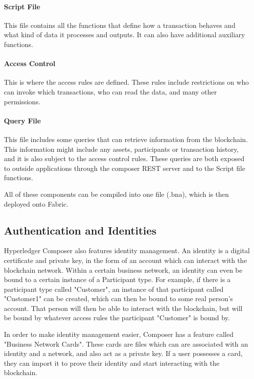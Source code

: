 \paragraph{Script File} This file contains all the functions that define how a transaction behaves and what kind of data it processes and outputs. It can also have additional auxiliary functions.

\paragraph{Access Control} This is where the access rules are defined. These rules include restrictions on who can invoke which transactions, who can read the data, and many other permissions.

\paragraph{Query File} This file includes some queries that can retrieve information from the blockchain. This information might include any assets, participants or transaction history, and it is also subject to the access control rules. These queries are both exposed to outside applications through the composer REST server and to the Script file functions.


All of these components can be compiled into one file (.bna), which is then deployed onto Fabric.

\subsection{Authentication and Identities}

Hyperledger Composer also features identity management. An identity is a digital certificate and private key, in the form of an account which can interact with the blockchain network. Within a certain business network, an identity can even be bound to a certain instance of a Participant type. For example, if there is a participant type called "Customer", an instance of that participant called "Customer1" can be created, which can then be bound to some real person's account. That person will then be able to interact with the blockchain, but will be bound by whatever access rules the participant "Customer" is bound by. 

In order to make identity management easier, Composer has a feature called "Business Network Cards". These cards are files which can are associated with an identity and a network, and also act as a private key. If a user possesses a card, they can import it to prove their identity and start interacting with the blockchain.

